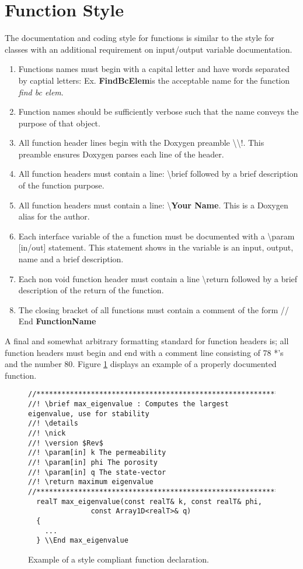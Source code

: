 \documentclass[letterpaper]{article}
\newcommand{\figref}[1]{Figure \ref{#1}}                %
\begin{document}
\section{Function Style}
The documentation and coding style for functions is similar to the style for classes with an additional requirement on input/output variable documentation.   
\begin{enumerate}
\item Functions names must begin with a capital letter and have words separated by captial letters: Ex. \textbf{FindBcElem}is the acceptable name for the function \textit{find bc elem}.  
\item Function names should be sufficiently verbose such that the name conveys the purpose of that object.  
\item All function header lines begin with the Doxygen preamble \textbackslash\textbackslash !.  This preamble ensures Doxygen parses each line of the header.  
\item All function headers must contain a line: \textbackslash brief followed by a brief description of the function purpose. 
\item All function headers must contain a line: \textbackslash \textbf{Your Name}.  This is a Doxygen alias for the author.  
\item Each interface variable of the a function must be documented with a \textbackslash param [in/out] statement.  This statement shows in the variable is an input, output, name and a brief description.  
\item Each non void function header must contain a line \textbackslash return followed by a brief description of the return of the function.  
\item The closing bracket of all functions must contain a comment of the form // End  \textbf{FunctionName}
\end{enumerate}
A final and somewhat arbitrary formatting standard for function headers is; all function headers must begin and end with a comment line consisting of 78 *'s and the number 80.  \figref{fig:function} displays an example of a properly documented function.  

\begin{figure}[h!]
\centering
\begin{verbatim}
//****************************************************************************80
//! \brief max_eigenvalue : Computes the largest eigenvalue, use for stability 
//! \details 
//! \nick 
//! \version $Rev$ 
//! \param[in] k The permeability
//! \param[in] phi The porosity
//! \param[in] q The state-vector
//! \return maximum eigenvalue
//****************************************************************************80
  realT max_eigenvalue(const realT& k, const realT& phi, 
		       const Array1D<realT>& q)
  {
	...   
  } \\End max_eigenvalue
\end{verbatim}
\caption{Example of a style compliant function declaration.}
\label{fig:function}
\end{figure}
\end{document}
